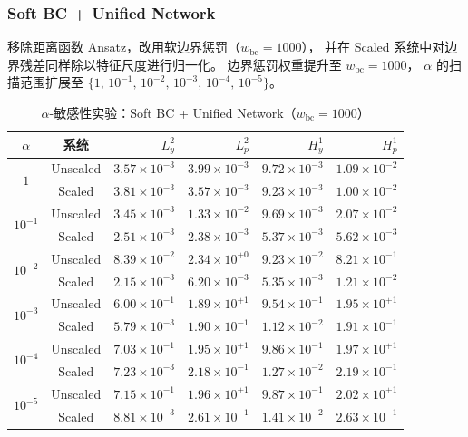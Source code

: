 \documentclass[UTF8, 12pt]{ctexart}
\begin{document}
\subsubsection{Soft BC + Unified Network}
移除距离函数 Ansatz，改用软边界惩罚（$w_{\mathrm{bc}} = 1000$），
并在 Scaled 系统中对边界残差同样除以特征尺度进行归一化。
边界惩罚权重提升至 $w_{\mathrm{bc}} = 1000$，
$\alpha$ 的扫描范围扩展至 $\{1,\,10^{-1},\,10^{-2},\,10^{-3},\,10^{-4},\,10^{-5}\}$。

\begin{table}[H]
  \centering
  \caption{$\alpha$-敏感性实验：Soft BC + Unified Network（$w_{\mathrm{bc}}=1000$）}
  \label{tab:alpha-soft-unified}
  \small
  \begin{tabular}{cc rrrr}
    \toprule
    $\alpha$ & 系统 & $L^2_y$ & $L^2_p$ & $H^1_y$ & $H^1_p$ \\
    \midrule
    \multirow{2}{*}{$1$}
      & Unscaled & $3.57\times10^{-3}$ & $3.99\times10^{-3}$
                 & $9.72\times10^{-3}$ & $1.09\times10^{-2}$ \\
      & Scaled   & $3.81\times10^{-3}$ & $3.57\times10^{-3}$
                 & $9.23\times10^{-3}$ & $1.00\times10^{-2}$ \\
    \midrule
    \multirow{2}{*}{$10^{-1}$}
      & Unscaled & $3.45\times10^{-3}$ & $1.33\times10^{-2}$
                 & $9.69\times10^{-3}$ & $2.07\times10^{-2}$ \\
      & Scaled   & $2.51\times10^{-3}$ & $2.38\times10^{-3}$
                 & $5.37\times10^{-3}$ & $5.62\times10^{-3}$ \\
    \midrule
    \multirow{2}{*}{$10^{-2}$}
      & Unscaled & $8.39\times10^{-2}$ & $2.34\times10^{+0}$
                 & $9.23\times10^{-2}$ & $8.21\times10^{-1}$ \\
      & Scaled   & $2.15\times10^{-3}$ & $6.20\times10^{-3}$
                 & $5.35\times10^{-3}$ & $1.21\times10^{-2}$ \\
    \midrule
    \multirow{2}{*}{$10^{-3}$}
      & Unscaled & $6.00\times10^{-1}$ & $1.89\times10^{+1}$
                 & $9.54\times10^{-1}$ & $1.95\times10^{+1}$ \\
      & Scaled   & $5.79\times10^{-3}$ & $1.90\times10^{-1}$
                 & $1.12\times10^{-2}$ & $1.91\times10^{-1}$ \\
    \midrule
    \multirow{2}{*}{$10^{-4}$}
      & Unscaled & $7.03\times10^{-1}$ & $1.95\times10^{+1}$
                 & $9.86\times10^{-1}$ & $1.97\times10^{+1}$ \\
      & Scaled   & $7.23\times10^{-3}$ & $2.18\times10^{-1}$
                 & $1.27\times10^{-2}$ & $2.19\times10^{-1}$ \\
    \midrule
    \multirow{2}{*}{$10^{-5}$}
      & Unscaled & $7.15\times10^{-1}$ & $1.96\times10^{+1}$
                 & $9.87\times10^{-1}$ & $2.02\times10^{+1}$ \\
      & Scaled   & $8.81\times10^{-3}$ & $2.61\times10^{-1}$
                 & $1.41\times10^{-2}$ & $2.63\times10^{-1}$ \\
    \bottomrule
  \end{tabular}
\end{table}
\end{document}
